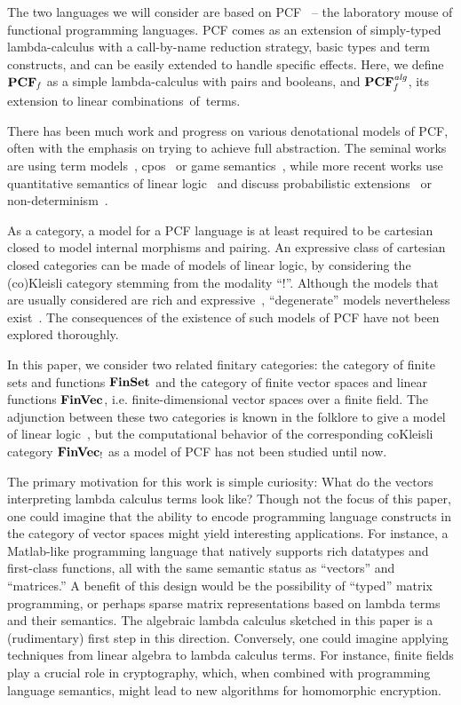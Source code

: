 \documentclass[10pt]{article}
\theoremstyle{plain}
\theoremstyle{definition}
\newcommand{\FinSet}{\mbox{\bf FinSet}}
\newcommand{\FinVec}{\mbox{\bf FinVec}}
\begin{document}
The two languages we will consider are based on PCF~\cite{dana93pcf} -- the
laboratory mouse of functional programming languages. PCF comes as an
extension of simply-typed lambda-calculus with a call-by-name reduction
strategy, basic types and term constructs, and can be easily
extended to handle specific effects. Here, we define ${\bf PCF}_{\it f}$
as a simple lambda-calculus with pairs and booleans, and ${\bf PCF}_{\it f}^{\it alg}$, its
extension to linear combinations~of~terms.

There has been much work and progress on various denotational models
of PCF,
often with the emphasis on trying to achieve full abstraction. The
seminal works are using term models~\cite{milner77},
cpos~\cite{plotkin77} or game
semantics~\cite{abramski00}, while more recent works use
quantitative semantics of linear logic~\cite{ll}
and discuss probabilistic extensions~\cite{pcs}
or non-determinism~\cite{bucciarelli12}.


As a category, a model for a PCF language is at least required to be
cartesian closed to model internal morphisms and pairing. An
expressive class of cartesian closed categories can be made of models
of linear logic, by considering the (co)Kleisli category stemming from
the modality ``$!$''.
Although the models that are usually
considered are rich and expressive~\cite{finiteness,pcs,bucciarelli12},
``degenerate'' 
models nevertheless exist~\cite{pratt94chu,hyland03glueing}.
The consequences of the existence of such models of PCF
have not been explored thoroughly.

In this paper, we consider
two related finitary categories: the category of finite sets and
functions ${\FinSet}$ and the category of finite vector
spaces and linear functions ${\FinVec}$, i.e.
 finite-dimensional vector spaces over a finite
field. The adjunction between these two categories
 is known in the folklore to give a model of
linear logic~\cite{pratt92mail}, 
but the computational behavior of the corresponding coKleisli
category $\FinVec_!$ as a
model of PCF has not been studied until now.

The primary motivation for this work is simple curiosity: What do the
vectors interpreting lambda calculus terms look like?  Though not the
focus of this paper, one could imagine that the ability to encode
programming language constructs in the category of vector spaces might
yield interesting applications.  For instance, a Matlab-like
programming language that natively supports rich datatypes and
first-class functions, all with the same semantic status as
``vectors'' and ``matrices.''  A benefit of this design would be the
possibility of ``typed'' matrix programming, or perhaps sparse matrix
representations based on lambda terms and their semantics.  The
algebraic lambda calculus sketched in this paper is a
(rudimentary) first step in this direction.  Conversely, one could
imagine applying techniques from linear algebra to lambda calculus
terms.  For instance, finite fields play a crucial role in
cryptography, which, when combined with programming language semantics,
might lead to new algorithms for homomorphic encryption.
\end{document}

